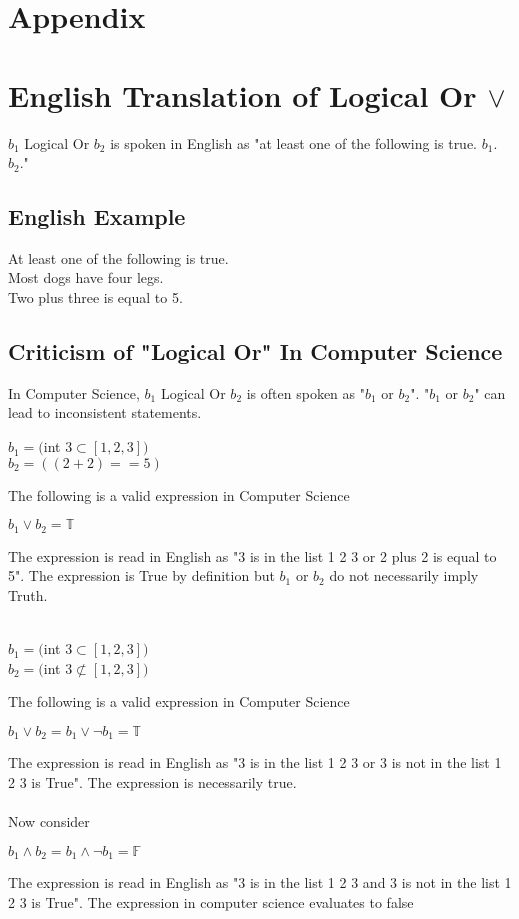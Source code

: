 \documentclass[11pt]{article}
\begin{document}
\newpage
\section*{Appendix}





\section{English Translation of Logical Or $\lor$}
$b_1$ Logical Or $b_2$ is spoken in English as "at least one of the following is true. $b_1$. $b_2.$"
\subsection{English Example}
At least one of the following is true.\\
Most dogs have four legs.\\
Two plus three is equal to 5.
\subsection{Criticism of "Logical Or" In Computer Science}
In Computer Science, $b_1$ Logical Or $b_2$ is often spoken as "$b_1$ or $b_2$". "$b_1$ or $b_2$" can lead to inconsistent statements.\\
\begin{center}
$b_1 = ($int $3 \subset [1,2,3])$\\
\vspace{2mm}
$b_2 = ((2 + 2) == 5)$\\
\end{center}
\vspace{2mm}
The following is a valid expression in Computer Science
\begin{center}
$
b_1 \lor b_2 = \mathbb{T}
$
\end{center}
The expression is read in English as "3 is in the list 1 2 3 or 2 plus 2 is equal to 5". The expression is True by definition but $b_1$ or $b_2$
do not necessarily imply Truth.\\\\
\begin{center}
$b_1 = ($int $3 \subset [1,2,3])$\\
\vspace{2mm}
$b_2 = ($int $3 \not \subset [1,2,3])$\\
\end{center}
\vspace{2mm}
The following is a valid expression in Computer Science
\begin{center}
$
 b_1 \lor b_2 =  b_1 \lor \lnot b_1 = \mathbb{T}
$
\end{center}
The expression is read in English as "3 is in the list 1 2 3 or 3 is not in the list 1 2 3 is True". The expression is necessarily true.\\
\\Now consider
\begin{center}
$
 b_1 \land b_2 =  b_1 \land \lnot b_1 = \mathbb{F}
$
\end{center}
The expression is read in English as "3 is in the list 1 2 3 and 3 is not in the list 1 2 3 is True". The expression in computer science evaluates to false
\end{document}
